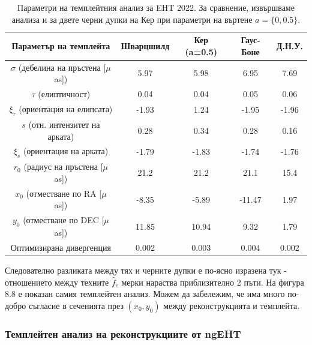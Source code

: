 \begin{table}[h!]
	\centering
	\begin{tabular}{c|c|c|c|c}
		\hline
		{Параметър на темплейта} & {Шварцшилд}&{Кер (a=0.5)}&{Гаус-Боне}&{Д.Н.У.}
		\\\hline\hline
		$\sigma$ {(\small дебелина на пръстена [$\mu$as])}& 5.97& 5.98& 6.95& 7.69
		\\
		$\tau$ {(\small елиптичност)} & 0.04& 0.04& 0.05& 0.06
		\\
		$\xi_\tau$ {(\small ориентация на елипсата)}& -1.93& 1.24& -1.95& -1.96
		\\
		$s$ {(\small отн. интензитет на арката)} & 0.28& 0.34& 0.28& 0.16
		\\
		$\xi_s$ {(\small ориентация на арката)}  & -1.79& -1.83& -1.74& -1.76
		\\\hline
		$r_0$ {(\small радиус на пръстена [$\mu$as])} & 21.2& 21.2& 21.1&15.4
		\\
		$x_0$ {(\small отместване по RA [$\mu$as])}  & -8.35& -5.89& -11.47& 1.97
		\\
		$y_0$ {(\small отместване по DEC [$\mu$as])} & 11.85& 10.94& 9.32& 1.79
		\\\hline\hline
		{Оптимизирана дивергенция} & 0.002& 0.003& 0.004& 0.002
		\\ \hline
	\end{tabular}
	\caption[Параметри на темплейтния анализ за EHT 2022.]{\small Параметри на темплейтния анализ за EHT 2022. За сравнение, извършваме анализа и за двете черни дупки на Кер при параметри на въртене $a =\{0,0.5\}$.}
	\label{table:VIDA_2022}
\end{table}

\newpage

Следователно разликата между тях и черните дупки е по-ясно изразена тук - отношението между техните $\hat{f}_c$ мерки нараства приблизително 2 пъти. 
На фигура 8.8 е показан самия темплейтен анализ. Можем да забележим, че има много по-добро съгласие в сеченията през $(x_0,y_0)$ между реконструкцията и темплейта.


\subsubsection{Темплейтен анализ на реконструкциите от ngEHT}

